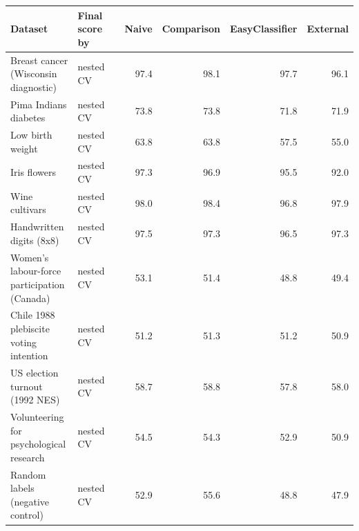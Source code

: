 \begin{tabular}{lllrrrr}
\toprule
Dataset & Final score by & & Naive & Comparison & EasyClassifier & External \\
\midrule
Breast cancer (Wisconsin diagnostic) & nested CV & & 97.4 & 98.1 & 97.7 & 96.1 \\
Pima Indians diabetes & nested CV & & 73.8 & 73.8 & 71.8 & 71.9 \\
Low birth weight & nested CV & & 63.8 & 63.8 & 57.5 & 55.0 \\
Iris flowers & nested CV & & 97.3 & 96.9 & 95.5 & 92.0 \\
Wine cultivars & nested CV & & 98.0 & 98.4 & 96.8 & 97.9 \\
Handwritten digits (8x8) & nested CV & & 97.5 & 97.3 & 96.5 & 97.3 \\
Women's labour-force participation (Canada) & nested CV & & 53.1 & 51.4 & 48.8 & 49.4 \\
Chile 1988 plebiscite voting intention & nested CV & & 51.2 & 51.3 & 51.2 & 50.9 \\
US election turnout (1992 NES) & nested CV & & 58.7 & 58.8 & 57.8 & 58.0 \\
Volunteering for psychological research & nested CV & & 54.5 & 54.3 & 52.9 & 50.9 \\
Random labels (negative control) & nested CV & & 52.9 & 55.6 & 48.8 & 47.9 \\
\bottomrule
\end{tabular}

